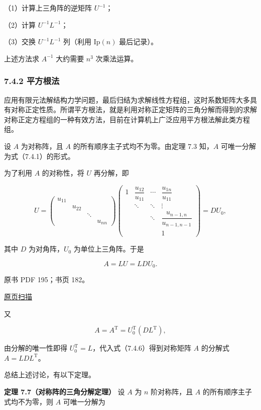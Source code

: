 \documentclass[
  10pt,
  fontset=fandol]{ctexart}
\begin{document}
（1）计算上三角阵的逆矩阵 \(U^{-1}\)；

（2）计算 \(U^{-1}L^{-1}\)；

（3）交换 \(U^{-1}L^{-1}\) 列（利用 \(\mathrm{Ip}(n)\) 最后记录）。

上述方法求 \(A^{-1}\) 大约需要 \(n^3\) 次乘法运算。

\subsubsection{7.4.2 平方根法}\label{ux5e73ux65b9ux6839ux6cd5}

应用有限元法解结构力学问题，最后归结为求解线性方程组，这时系数矩阵大多具有对称正定性质。所谓平方根法，就是利用对称正定矩阵的三角分解而得到的求解对称正定方程组的一种有效方法，目前在计算机上广泛应用平方根法解此类方程组。

设 \(A\) 为对称阵，且 \(A\) 的所有顺序主子式均不为零。由定理 7.3 知，\(A\) 可唯一分解为式（7.4.1）的形式。

为了利用 \(A\) 的对称性，将 \(U\) 再分解，即

\[
U=\begin{pmatrix}
u_{11}&&&\\
&u_{22}&&\\
&&\ddots&\\
&&&u_{nn}
\end{pmatrix}
\begin{pmatrix}
1&\dfrac{u_{12}}{u_{11}}&\cdots&\dfrac{u_{1n}}{u_{11}}\\
&\ddots&\ddots&\vdots\\
&&\ddots&\dfrac{u_{n-1,n}}{u_{n-1,n-1}}\\
&&&1
\end{pmatrix}=DU_0,
\]

其中 \(D\) 为对角阵，\(U_0\) 为单位上三角阵。于是

\[A=LU=LDU_0.\tag{7.4.6}\]

\clearpage

原书 PDF 195；书页 182。

\href{../../../source-images/pdf-195.jpeg}{原页扫描}

又

\[A=A^{\mathrm T}=U_0^{\mathrm T}(DL^{\mathrm T}),\]

由分解的唯一性即得 \(U_0^{\mathrm T}=L\)，代入式（7.4.6）得到对称矩阵 \(A\) 的分解式 \(A=LDL^{\mathrm T}\)。

总结上述讨论，有以下定理。

\textbf{定理 7.7（对称阵的三角分解定理）} 设 \(A\) 为 \(n\) 阶对称阵，且 \(A\) 的所有顺序主子式均不为零，则 \(A\) 可唯一分解为
\end{document}
